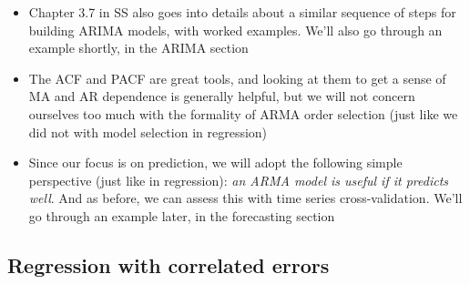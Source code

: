 \documentclass{article}
\begin{document}
\begin{itemize}
\item Chapter 3.7 in SS also goes into details about a similar sequence of steps
  for building ARIMA models, with worked examples. We'll also go through an
  example shortly, in the ARIMA section 

\item The ACF and PACF are great tools, and looking at them to get a sense of MA
  and AR dependence is generally helpful, but we will not concern ourselves too
  much with the formality of ARMA order selection (just like we did not with
  model selection in regression) 

\item Since our focus is on prediction, we will adopt the following simple
  perspective (just like in regression): \emph{an ARMA model is useful if it
    predicts well}. And as before, we can assess this with time series
  cross-validation. We'll go through an example later, in the forecasting
  section   
\end{itemize}

\subsection{Regression with correlated errors}
\end{document}
